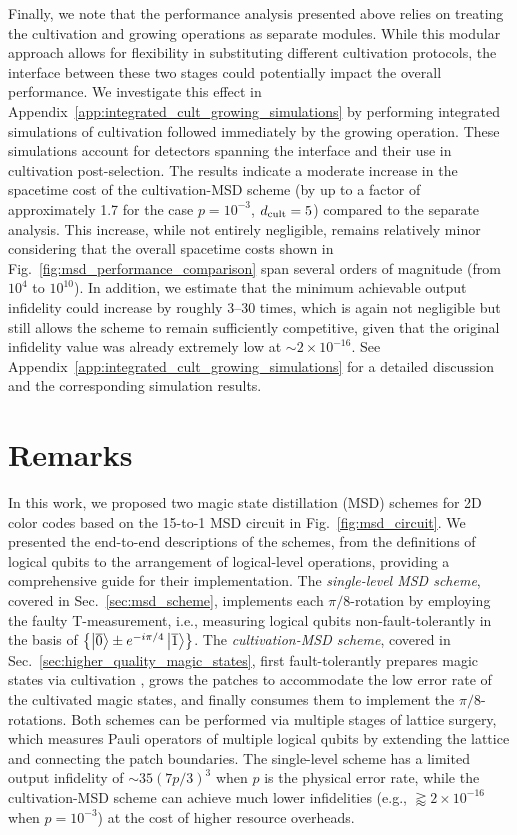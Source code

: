 \documentclass[
 prx,
 reprint,
 superscriptaddress,
 longbibliography,
 dvipsnames
]{revtex4-2}
\begin{document}
\label{para:integrated_cultivation_growing}
Finally, we note that the performance analysis presented above relies on treating the cultivation and growing operations as separate modules. 
While this modular approach allows for flexibility in substituting different cultivation protocols, the interface between these two stages could potentially impact the overall performance. 
We investigate this effect in Appendix~\ref{app:integrated_cult_growing_simulations} by performing integrated simulations of cultivation followed immediately by the growing operation. 
These simulations account for detectors spanning the interface and their use in cultivation post-selection.
The results indicate a moderate increase in the spacetime cost of the cultivation-MSD scheme (by up to a factor of approximately 1.7 for the case $p = 10^{-3}$, $d_\mathrm{cult} = 5$) compared to the separate analysis.
This increase, while not entirely negligible, remains relatively minor considering that the overall spacetime costs shown in Fig.~\ref{fig:msd_performance_comparison} span several orders of magnitude (from $10^4$ to $10^{10}$).
In addition, we estimate that the minimum achievable output infidelity could increase by roughly 3--30 times, which is again not negligible but still allows the scheme to remain sufficiently competitive, given that the original infidelity value was already extremely low at $\sim 2 \times 10^{-16}$.
See Appendix~\ref{app:integrated_cult_growing_simulations} for a detailed discussion and the corresponding simulation results.


\section{Remarks \label{sec:remarks}}

In this work, we proposed two magic state distillation (MSD) schemes for 2D color codes based on the 15-to-1 MSD circuit in Fig.~\ref{fig:msd_circuit}.
We presented the end-to-end descriptions of the schemes, from the definitions of logical qubits to the arrangement of logical-level operations, providing a comprehensive guide for their implementation.
The \textit{single-level MSD scheme}, covered in Sec.~\ref{sec:msd_scheme}, implements each $\pi/8$-rotation by employing the faulty T-measurement, i.e., measuring logical qubits non-fault-tolerantly in the basis of $\qty{\ket{\overline{0}} \pm e^{-i\pi/4} \ket{\overline{1}}}$.
The \textit{cultivation-MSD scheme}, covered in Sec.~\ref{sec:higher_quality_magic_states}, first fault-tolerantly prepares magic states via cultivation \cite{chamberland2020very,itogawa2024even,gidney2024magic}, grows the patches to accommodate the low error rate of the cultivated magic states, and finally consumes them to implement the $\pi/8$-rotations.
Both schemes can be performed via multiple stages of lattice surgery, which measures Pauli operators of multiple logical qubits by extending the lattice and connecting the patch boundaries.
The single-level scheme has a limited output infidelity of $\sim 35(7p/3)^3$ when $p$ is the physical error rate, while the cultivation-MSD scheme can achieve much lower infidelities (e.g., $\gtrapprox 2 \times 10^{-16}$ when $p=10^{-3}$) at the cost of higher resource overheads.
\end{document}
